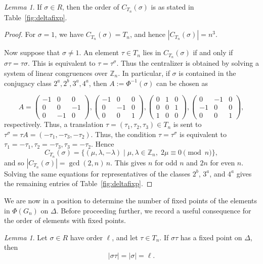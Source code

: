 \documentclass[12pt]{article}
\theoremstyle{definition}
\theoremstyle{remark}
\newtheorem{lemma}[theorem]{Lemma}
\begin{document}
\begin{lemma}
If $\sigma\in R$, then the order of $C_{T_n}(\sigma)$ is as stated in Table~\ref{fig:deltafixp}.
\end{lemma}
\begin{proof}
For $\sigma=1$, we have $C_{T_n}(\sigma)=T_n$, and hence $|C_{T_n}(\sigma)|=n^3$.

Now suppose that $\sigma\neq 1$. An element $\tau\in T_n$ lies in $C_{T_n}(\sigma)$ if and only if
$\sigma\tau=\tau\sigma.$
This is equivalent to
$\tau=\tau^\sigma$.
Thus the centralizer is obtained by solving a system of linear congruences over $\mathbb Z_n$. In particular, if $\sigma$ is contained in the conjugacy class $2^a,2^b,3^a,4^a$, then $A:=\Phi^{-1}(\sigma)$ can be chosen as

\[
A=\begin{pmatrix}
  -1 &   0 &   0 \\
     0&    0&  -1 \\
   0&  -1&   0
\end{pmatrix},
\begin{pmatrix} -1 & 0 & 0 \\
0 & -1 & 0 \\
0 & 0 & 1
\end{pmatrix},
\begin{pmatrix}
  0 &   1 &   0 \\
     0&    0&  1 \\
   1&  0&   0
\end{pmatrix},
\begin{pmatrix} 0 & -1 & 0 \\
-1 & 0 & 0 \\
0 & 0 & 1
\end{pmatrix},
\]
respectively.
Thus, a translation $\tau=(\tau_1,\tau_2,\tau_3)\in T_n$ is sent to $\tau^\sigma=\tau A=(-\tau_1,-\tau_3,-\tau_2).$
Thus, the condition $\tau=\tau^\sigma$ is equivalent to
$\tau_1=-\tau_1,\tau_2=-\tau_3, \tau_3=-\tau_2.$
Hence
\[
C_{T_n}(\sigma)=\{(\mu,\lambda,-\lambda)\mid \mu,\lambda\in\mathbb Z_n,\; 2\mu\equiv 0\pmod n\},
\]
and so $|C_{T_n}(\sigma)|=\gcd(2,n)\,n.$
This gives $n$ for odd $n$ and $2n$ for even $n$. Solving the same equations for representatives of the classes $2^b$, $3^a$, and $4^a$ gives the remaining entries of Table~\ref{fig:deltafixp}.

\end{proof}




We are now in a position to determine the
number of fixed points of the elements in $\Phi(G_n)$ on $\Delta$.
Before proceeding further, we record a useful consequence for the order of elements with fixed points.
\begin{lemma}\label{lem:five}
Let $\sigma\in R$ have order $\ell$, and let $\tau\in T_n$. If $\sigma\tau$ has a fixed point on $\Delta$, then
\[
|\sigma\tau|=|\sigma|=\ell.
\]
\end{lemma}
\end{document}
